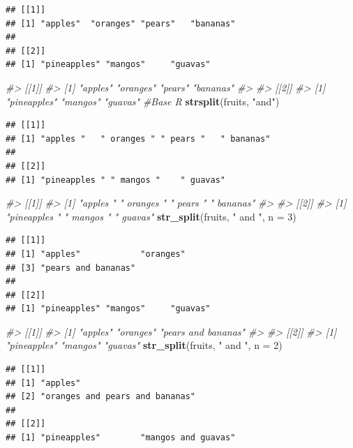 \documentclass[10pt,]{krantz}
\makeatletter
\newenvironment{Shaded}{\begin{snugshade}}{\end{snugshade}}
\newcommand{\KeywordTok}[1]{\textcolor[rgb]{0.13,0.29,0.53}{\textbf{#1}}}
\newcommand{\DataTypeTok}[1]{\textcolor[rgb]{0.13,0.29,0.53}{#1}}
\newcommand{\DecValTok}[1]{\textcolor[rgb]{0.00,0.00,0.81}{#1}}
\newcommand{\StringTok}[1]{\textcolor[rgb]{0.31,0.60,0.02}{#1}}
\newcommand{\CommentTok}[1]{\textcolor[rgb]{0.56,0.35,0.01}{\textit{#1}}}
\newcommand{\NormalTok}[1]{#1}
\newenvironment{kframe}{%
\medskip{}
\setlength{\fboxsep}{.8em}
 \def\at@end@of@kframe{}%
 \ifinner\ifhmode%
  \def\at@end@of@kframe{\end{minipage}}%
  \begin{minipage}{\columnwidth}%
 \fi\fi%
 \def\FrameCommand##1{\hskip\@totalleftmargin \hskip-\fboxsep
 \colorbox{shadecolor}{##1}\hskip-\fboxsep
     \hskip-\linewidth \hskip-\@totalleftmargin \hskip\columnwidth}%
 \MakeFramed {\advance\hsize-\width
   \@totalleftmargin\z@ \linewidth\hsize
   \@setminipage}}%
 {\par\unskip\endMakeFramed%
 \at@end@of@kframe}
\renewenvironment{Shaded}{\begin{kframe}}{\end{kframe}}
\makeatother
\begin{document}
\begin{verbatim}
## [[1]]
## [1] "apples"  "oranges" "pears"   "bananas"
## 
## [[2]]
## [1] "pineapples" "mangos"     "guavas"
\end{verbatim}

\begin{Shaded}
\begin{Highlighting}[]
\CommentTok{#> [[1]]}
\CommentTok{#> [1] "apples"  "oranges" "pears"   "bananas"}
\CommentTok{#> }
\CommentTok{#> [[2]]}
\CommentTok{#> [1] "pineapples" "mangos"     "guavas"}
\CommentTok{#Base R}
\KeywordTok{strsplit}\NormalTok{(fruits, }\StringTok{"and"}\NormalTok{)}
\end{Highlighting}
\end{Shaded}

\begin{verbatim}
## [[1]]
## [1] "apples "   " oranges " " pears "   " bananas" 
## 
## [[2]]
## [1] "pineapples " " mangos "    " guavas"
\end{verbatim}

\begin{Shaded}
\begin{Highlighting}[]
\CommentTok{#> [[1]]}
\CommentTok{#> [1] "apples "   " oranges " " pears "   " bananas" }
\CommentTok{#> }
\CommentTok{#> [[2]]}
\CommentTok{#> [1] "pineapples " " mangos "    " guavas"}
\KeywordTok{str_split}\NormalTok{(fruits, }\StringTok{" and "}\NormalTok{, }\DataTypeTok{n =} \DecValTok{3}\NormalTok{)}
\end{Highlighting}
\end{Shaded}

\begin{verbatim}
## [[1]]
## [1] "apples"            "oranges"          
## [3] "pears and bananas"
## 
## [[2]]
## [1] "pineapples" "mangos"     "guavas"
\end{verbatim}

\begin{Shaded}
\begin{Highlighting}[]
\CommentTok{#> [[1]]}
\CommentTok{#> [1] "apples"            "oranges"           "pears and bananas"}
\CommentTok{#> }
\CommentTok{#> [[2]]}
\CommentTok{#> [1] "pineapples" "mangos"     "guavas"}
\KeywordTok{str_split}\NormalTok{(fruits, }\StringTok{" and "}\NormalTok{, }\DataTypeTok{n =} \DecValTok{2}\NormalTok{)}
\end{Highlighting}
\end{Shaded}

\begin{verbatim}
## [[1]]
## [1] "apples"                       
## [2] "oranges and pears and bananas"
## 
## [[2]]
## [1] "pineapples"        "mangos and guavas"
\end{verbatim}
\end{document}
